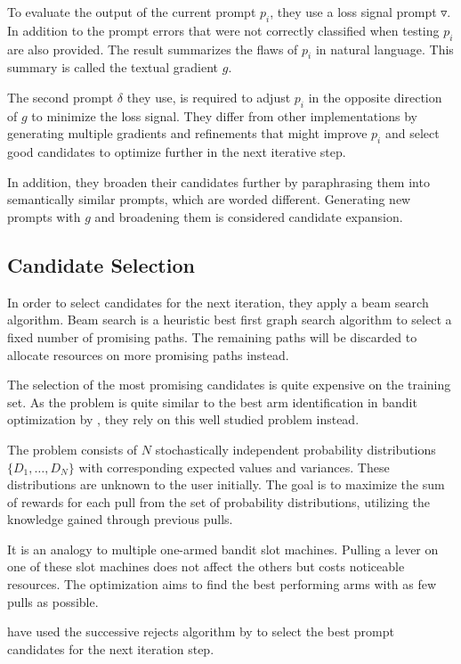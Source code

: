 To evaluate the output of the current prompt $p_i$, they use a loss signal prompt $\triangledown$. In addition to the prompt errors that were not correctly classified when testing $p_i$ are also provided. The result summarizes the flaws of $p_i$ in natural language. This summary is called the textual gradient $g$.

The second prompt $\delta$ they use, is required to adjust $p_i$ in the opposite direction of $g$ to minimize the loss signal. They differ from other implementations by generating multiple gradients and refinements that might improve $p_i$ and select good candidates to optimize further in the next iterative step.

In addition, they broaden their candidates further by paraphrasing them into semantically similar prompts, which are worded different. Generating new prompts with $g$ and broadening them is considered candidate expansion.

\subsection{Candidate Selection}
In order to select candidates for the next iteration, they apply a beam search algorithm. Beam search is a heuristic best first graph search algorithm to select a fixed number of promising paths. The remaining paths will be discarded to allocate resources on more promising paths instead. \cite{BeamSearch}

The selection of the most promising candidates is quite expensive on the training set. As the problem is quite similar to the best arm identification in bandit optimization by , they rely on this well studied problem instead.

The problem consists of $N$ stochastically independent probability distributions $\{ D_1, \dots, D_N\}$ with corresponding expected values and variances. These distributions are unknown to the user initially. The goal is to maximize the sum of rewards for each pull from the set of probability distributions, utilizing the knowledge gained through previous pulls. \cite{kuleshov2014AlgorithmsMultiarmeda}

It is an analogy to multiple one-armed bandit slot machines. Pulling a lever on one of these slot machines does not affect the others but costs noticeable resources. The optimization aims to find the best performing arms with as few pulls as possible. 

\citeauthor{pryzant2023AutomaticPrompt} have used the successive rejects algorithm by  to select the best prompt candidates for the next iteration step.

